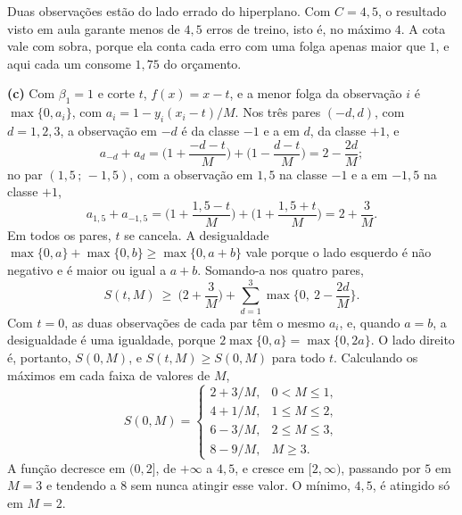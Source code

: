 \documentclass[11pt,a4paper]{article}
\begin{document}
\begin{solucao}
Duas observações estão do lado errado do hiperplano. Com $C=4{,}5$, o resultado visto
em aula garante menos de $4{,}5$ erros de treino, isto é, no máximo $4$. A cota vale
com sobra, porque ela conta cada erro com uma folga apenas maior que $1$, e aqui cada
um consome $1{,}75$ do orçamento.

\smallskip
\textbf{(c)} Com $\beta_1=1$ e corte $t$, $f(x)=x-t$, e a menor folga da observação
$i$ é $\max\{0,a_i\}$, com $a_i=1-y_i(x_i-t)/M$. Nos três pares $(-d,d)$, com
$d=1,2,3$, a observação em $-d$ é da classe $-1$ e a em $d$, da classe $+1$, e
\[
  a_{-d}+a_d=\Big(1+\frac{-d-t}{M}\Big)+\Big(1-\frac{d-t}{M}\Big)=2-\frac{2d}{M};
\]
no par $(1{,}5\,;\,-1{,}5)$, com a observação em $1{,}5$ na classe $-1$ e a em
$-1{,}5$ na classe $+1$,
\[
  a_{1{,}5}+a_{-1{,}5}=\Big(1+\frac{1{,}5-t}{M}\Big)+\Big(1+\frac{1{,}5+t}{M}\Big)
  =2+\frac{3}{M}.
\]
Em todos os pares, $t$ se cancela. A desigualdade
$\max\{0,a\}+\max\{0,b\}\ge\max\{0,a+b\}$ vale porque o lado esquerdo é não negativo e
é maior ou igual a $a+b$. Somando-a nos quatro pares,
\[
  S(t,M)\ \ge\ \Big(2+\frac3M\Big)+\sum_{d=1}^{3}\max\Big\{0,\ 2-\frac{2d}{M}\Big\}.
\]
Com $t=0$, as duas observações de cada par têm o mesmo $a_i$, e, quando $a=b$, a
desigualdade é uma igualdade, porque $2\max\{0,a\}=\max\{0,2a\}$. O lado direito é,
portanto, $S(0,M)$, e $S(t,M)\ge S(0,M)$ para todo $t$. Calculando os máximos em cada
faixa de valores de $M$,
\[
  S(0,M)=\begin{cases}
    2+3/M, & 0<M\le1,\\
    4+1/M, & 1\le M\le2,\\
    6-3/M, & 2\le M\le3,\\
    8-9/M, & M\ge3.
  \end{cases}
\]
A função decresce em $(0,2]$, de $+\infty$ a $4{,}5$, e cresce em $[2,\infty)$,
passando por $5$ em $M=3$ e tendendo a $8$ sem nunca atingir esse valor. O mínimo,
$4{,}5$, é atingido só em $M=2$.
\begin{center}
\end{center}


\end{solucao}
\end{document}
